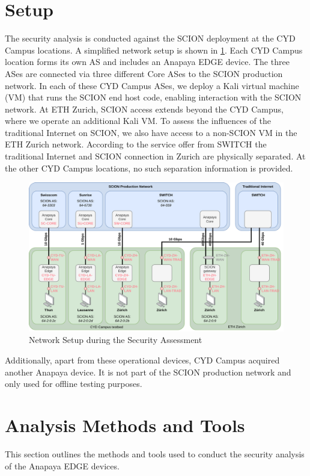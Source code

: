 \section{Setup}
\label{sec:setup}
The security analysis is conducted against the SCION deployment at the CYD Campus locations.
A simplified network setup is shown in \cref{fig:network-setup}.
Each CYD Campus location forms its own AS and includes an Anapaya EDGE device.
The three ASes are connected via three different Core ASes to the SCION production network.
In each of these CYD Campus ASes, we deploy a Kali virtual machine (VM) that runs the SCION end host code, enabling interaction with the SCION network.
At ETH Zurich, SCION access extends beyond the CYD Campus, where we operate an additional Kali VM.
To assess the influences of the traditional Internet on SCION, we also have access to a non-SCION VM in the ETH Zurich network.
According to the service offer from SWITCH the traditional Internet and SCION connection in Zurich are physically separated.
At the other CYD Campus locations, no such separation information is provided.

\begin{figure}[h]
    \centering
    \includegraphics[width=\textwidth]{figures/scion_setup2.drawio.png}
    \caption{Network Setup during the Security Assessment}
    \label{fig:network-setup}
\end{figure}

Additionally, apart from these operational devices, CYD Campus acquired another Anapaya device.
It is not part of the SCION production network and only used for offline testing purposes.

\newpage
\section{Analysis Methods and Tools}
\label{sec:analysis-methods-tools}
This section outlines the methods and tools used to conduct the security analysis of the Anapaya EDGE devices.

